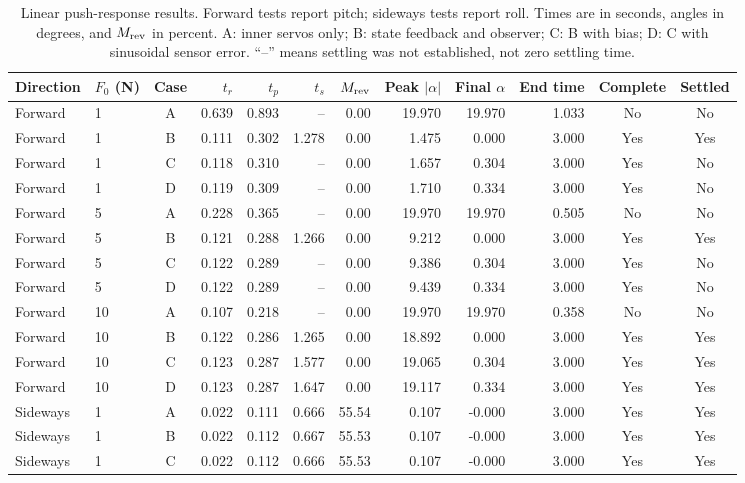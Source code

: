 \documentclass[conference,a4paper]{IEEEtran}
\begin{document}
\begin{table}[!t]
\centering\footnotesize
\caption{Linear push-response results. Forward tests report pitch; sideways tests report roll. Times are in seconds, angles in degrees, and $M_{\rm rev}$ in percent. A: inner servos only; B: state feedback and observer; C: B with bias; D: C with sinusoidal sensor error. ``--'' means settling was not established, not zero settling time.}
\label{tab:push_linear}
\setlength{\tabcolsep}{5pt}
\begin{tabular}{@{}llcrrrrrrrcc@{}}
\toprule
Direction & $F_0$ (N) & Case & $t_r$ & $t_p$ & $t_s$ & $M_{\rm rev}$ & Peak $|\alpha|$ & Final $\alpha$ & End time & Complete & Settled\\
\midrule
Forward & 1 & A & 0.639 & 0.893 & -- & 0.00 & 19.970 & 19.970 & 1.033 & No & No\\
Forward & 1 & B & 0.111 & 0.302 & 1.278 & 0.00 & 1.475 & 0.000 & 3.000 & Yes & Yes\\
Forward & 1 & C & 0.118 & 0.310 & -- & 0.00 & 1.657 & 0.304 & 3.000 & Yes & No\\
Forward & 1 & D & 0.119 & 0.309 & -- & 0.00 & 1.710 & 0.334 & 3.000 & Yes & No\\
\midrule
Forward & 5 & A & 0.228 & 0.365 & -- & 0.00 & 19.970 & 19.970 & 0.505 & No & No\\
Forward & 5 & B & 0.121 & 0.288 & 1.266 & 0.00 & 9.212 & 0.000 & 3.000 & Yes & Yes\\
Forward & 5 & C & 0.122 & 0.289 & -- & 0.00 & 9.386 & 0.304 & 3.000 & Yes & No\\
Forward & 5 & D & 0.122 & 0.289 & -- & 0.00 & 9.439 & 0.334 & 3.000 & Yes & No\\
\midrule
Forward & 10 & A & 0.107 & 0.218 & -- & 0.00 & 19.970 & 19.970 & 0.358 & No & No\\
Forward & 10 & B & 0.122 & 0.286 & 1.265 & 0.00 & 18.892 & 0.000 & 3.000 & Yes & Yes\\
Forward & 10 & C & 0.123 & 0.287 & 1.577 & 0.00 & 19.065 & 0.304 & 3.000 & Yes & Yes\\
Forward & 10 & D & 0.123 & 0.287 & 1.647 & 0.00 & 19.117 & 0.334 & 3.000 & Yes & Yes\\
\midrule
Sideways & 1 & A & 0.022 & 0.111 & 0.666 & 55.54 & 0.107 & -0.000 & 3.000 & Yes & Yes\\
Sideways & 1 & B & 0.022 & 0.112 & 0.667 & 55.53 & 0.107 & -0.000 & 3.000 & Yes & Yes\\
Sideways & 1 & C & 0.022 & 0.112 & 0.666 & 55.53 & 0.107 & -0.000 & 3.000 & Yes & Yes\\

\end{tabular}
\end{table}
\end{document}
